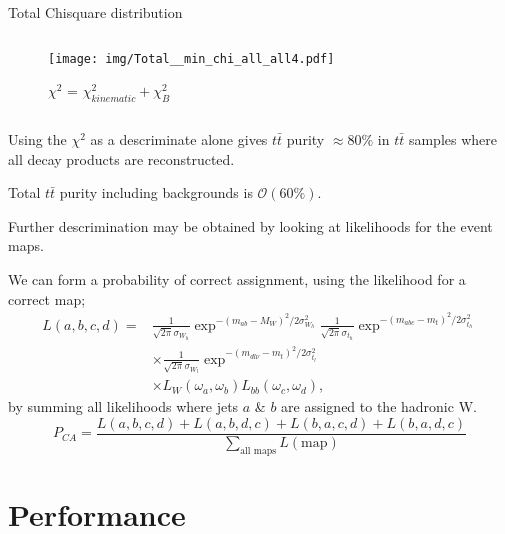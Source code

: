 \documentclass{beamer}
\begin{document}
\begin{frame}{Total Chisquare distribution}
  \begin{columns}
    \begin{column}{0.45\textwidth}\begin{figure}
      \caption{$\chi^2$ = $\chi^2_{kinematic} + \chi^2_{B}$}
      \texttt{[image: img/Total\_\_min\_chi\_all\_all4.pdf]}
    \end{figure}\end{column}
  \end{columns}
\end{frame}

\begin{frame}
Using the $\chi^2$ as a descriminate alone gives $t\bar{t}$ purity $\approx80\%$ in $t\bar{t}$ samples where all decay products are reconstructed.

Total $t\bar{t}$ purity including backgrounds is $\mathcal{O}\left(60\%\right)$.

Further descrimination may be obtained by looking at likelihoods for the event maps.

\end{frame}

\begin{frame}
We can form a probability of correct assignment, using the likelihood for a correct map;
  \begin{equation}\begin{split}
    L\left(a,b,c,d\right) =&
    \frac{1}{\sqrt{2\pi}\sigma_{W_{h}}} \exp^{-\left(m_{ab}-M_{W}\right)^{2} / 2\sigma^{2}_{W_{h}}}
    \frac{1}{\sqrt{2\pi}\sigma_{t_{h}}} \exp^{-\left(m_{abc}-m_{t}\right)^{2} / 2\sigma^{2}_{t_{h}}}
    \\&\times
    \frac{1}{\sqrt{2\pi}\sigma_{W_{l}}} \exp^{-\left(m_{dl\nu}-m_{t}\right)^{2} / 2\sigma^{2}_{t_{l}}}
    \\&\times
    L_{W}\left(\omega_{a},\omega_{b}\right) L_{bb}\left(\omega_{c},\omega_{d}\right),
  \end{split}\end{equation}
by summing all likelihoods where jets $a$ \& $b$ are assigned to the hadronic W.
\begin{equation}
P_{CA} = \frac{L\left(a,b,c,d\right) + L\left(a,b,d,c\right) + L\left(b,a,c,d\right) + L\left(b,a,d,c\right)}{\sum_{\text{all maps}} L\left(\text{map}\right)}
\end{equation}
\end{frame}

\section{Performance}
\end{document}
